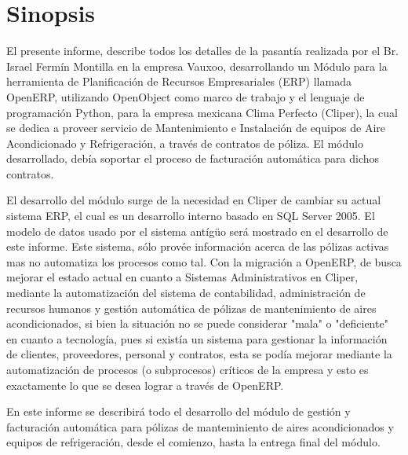 \documentclass[a4paper, 12pt]{article}
\begin{document}
\tableofcontents

\newpage

\section{Sinopsis}
El presente informe, describe todos los detalles de la pasantía realizada por el Br. Israel Fermín Montilla en la empresa Vauxoo, desarrollando un Módulo para la herramienta de Planificación de Recursos Empresariales (ERP) llamada OpenERP, utilizando OpenObject como marco de trabajo y el lenguaje de programación Python, para la empresa mexicana Clima Perfecto (Cliper), la cual se dedica a proveer servicio de Mantenimiento e Instalación de equipos de Aire Acondicionado y Refrigeración, a través de contratos de póliza. El módulo desarrollado, debía soportar el proceso de facturación automática para dichos contratos.

El desarrollo del módulo surge de la necesidad en Cliper de cambiar su actual sistema ERP, el cual es un desarrollo interno basado en SQL Server 2005. El modelo de datos usado por el sistema antígüo será mostrado en el desarrollo de este informe. Este sistema, sólo provée información acerca de las pólizas activas mas no automatiza los procesos como tal. Con la migración a OpenERP, de busca mejorar el estado actual en cuanto a Sistemas Administrativos en Cliper, mediante la automatización del sistema de contabilidad, administración de recursos humanos y gestión automática de pólizas de mantenimiento de aires acondicionados, si bien la situación no se puede considerar "mala" o "deficiente" en cuanto a tecnología, pues si existía un sistema para gestionar la información de clientes, proveedores, personal y contratos, esta se podía mejorar mediante la automatización de procesos (o subprocesos) críticos de la empresa y esto es exactamente lo que se desea lograr a través de OpenERP.

En este informe se describirá todo el desarrollo del módulo de gestión y facturación automática para pólizas de manteminiento de aires acondicionados y equipos de refrigeración, desde el comienzo, hasta la entrega final del módulo. 

\newpage
\end{document}
